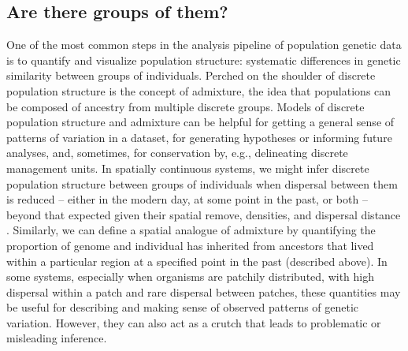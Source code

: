 \documentclass{ar-1col}
\begin{document}
\subsection{Are there groups of them?}
One of the most common steps in the analysis pipeline of population genetic data
is to quantify and visualize population structure:
systematic differences in genetic similarity between groups of individuals.
Perched on the shoulder of discrete population structure is the concept of admixture,
the idea that populations can be composed of ancestry from multiple discrete groups.
Models of discrete population structure and admixture 
\citep[e.g.,][]{STRUCTURE, ADMIXTURE}
can be helpful for getting a general sense of patterns of variation in a dataset, 
for generating hypotheses or informing future analyses, 
and, sometimes, for conservation by, 
e.g., delineating discrete management units.
In spatially continuous systems, 
we might infer discrete population structure between groups of individuals 
when dispersal between them is reduced -- 
either in the modern day, at some point in the past, or both -- 
beyond that expected given their spatial remove, densities, and dispersal distance
\citep{conStruct}.
Similarly, we can define a spatial analogue of admixture 
by quantifying the proportion of genome and individual 
has inherited from ancestors that lived within a particular region 
at a specified point in the past (described above).
In some systems, 
especially when organisms are patchily distributed, 
with high dispersal within a patch and rare dispersal between patches,
these quantities may be useful for describing 
and making sense of observed patterns of genetic variation.
However, 
they can also act as a crutch that leads to problematic or misleading inference.
\end{document}
